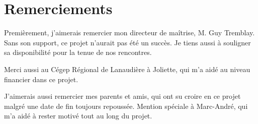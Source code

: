 \chapter*{Remerciements}

Premi\`erement, j'aimerais remercier mon directeur de ma\^itrise, M. Guy Tremblay.
Sans son support, ce projet n'aurait pas \'et\'e un succ\`es.
Je tiens aussi \`a souligner sa disponibilit\'e pour la tenue de nos rencontres.

Merci aussi au C\'egep R\'egional de Lanaudi\`ere \`a Joliette, qui m'a aid\'e au niveau financier dans ce projet.

J'aimerais aussi remercier mes parents et amis, qui ont su croire en ce projet malgr\'e une date de fin toujours repouss\'ee.
Mention sp\'eciale \`a Marc-Andr\'e, qui m'a aid\'e \`a rester motiv\'e tout au long du projet.
